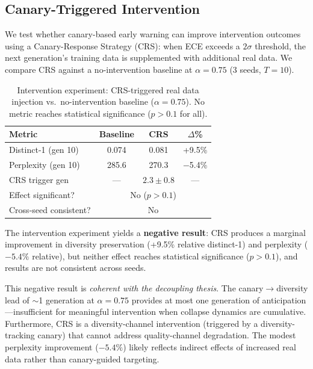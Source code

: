 \documentclass[letterpaper,11pt]{article}
\begin{document}
\subsection{Canary-Triggered Intervention}
\label{sec:intervention}

We test whether canary-based early warning can improve intervention outcomes using a Canary-Response Strategy (CRS): when ECE exceeds a $2\sigma$ threshold, the next generation's training data is supplemented with additional real data.
We compare CRS against a no-intervention baseline at $\alpha{=}0.75$ (3 seeds, $T{=}10$).

\begin{table}[t]
\centering
\caption{Intervention experiment: CRS-triggered real data injection vs.\ no-intervention baseline ($\alpha{=}0.75$). No metric reaches statistical significance ($p > 0.1$ for all).}
\label{tab:intervention}
\small
\begin{tabular}{@{}lccc@{}}
\toprule
Metric & Baseline & CRS & $\Delta$\% \\
\midrule
Distinct-1 (gen 10) & 0.074 & 0.081 & +9.5\% \\
Perplexity (gen 10) & 285.6 & 270.3 & $-$5.4\% \\
CRS trigger gen & --- & $2.3 \pm 0.8$ & --- \\
Effect significant? & \multicolumn{3}{c}{No ($p > 0.1$)} \\
Cross-seed consistent? & \multicolumn{3}{c}{No} \\
\bottomrule
\end{tabular}
\end{table}

The intervention experiment yields a \textbf{negative result}: CRS produces a marginal improvement in diversity preservation (+9.5\% relative distinct-1) and perplexity ($-5.4\%$ relative), but neither effect reaches statistical significance ($p > 0.1$), and results are not consistent across seeds.

This negative result is \emph{coherent with the decoupling thesis}.
The canary$\to$diversity lead of $\sim$1 generation at $\alpha{=}0.75$ provides at most one generation of anticipation---insufficient for meaningful intervention when collapse dynamics are cumulative.
Furthermore, CRS is a diversity-channel intervention (triggered by a diversity-tracking canary) that cannot address quality-channel degradation.
The modest perplexity improvement ($-5.4\%$) likely reflects indirect effects of increased real data rather than canary-guided targeting.
\end{document}
